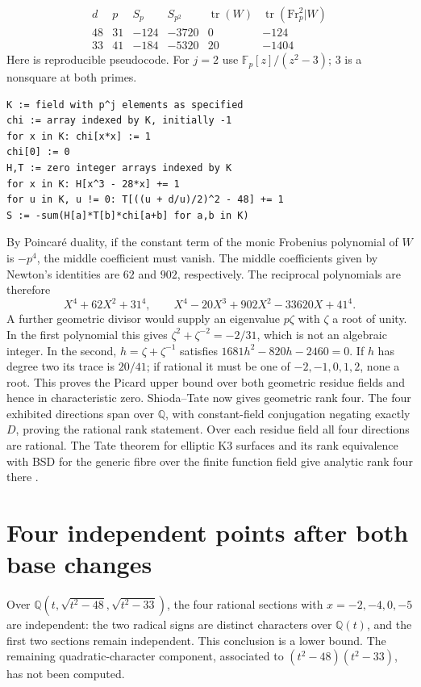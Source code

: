 \documentclass[11pt]{article}
\newcommand{\Q}{\mathbb Q}
\newcommand{\F}{\mathbb F}
\begin{document}
\[
\begin{array}{r|r|r|r|r|r}
d&p&S_p&S_{p^2}&\operatorname{tr}(W)&\operatorname{tr}(\mathrm{Fr}_p^2|W)\\\hline
48&31&-124&-3720&0&-124\\
33&41&-184&-5320&20&-1404
\end{array}
\]
Here is reproducible pseudocode. For $j=2$ use
$\F_p[z]/(z^2-3)$; $3$ is a nonsquare at both primes.
\begin{verbatim}
K := field with p^j elements as specified
chi := array indexed by K, initially -1
for x in K: chi[x*x] := 1
chi[0] := 0
H,T := zero integer arrays indexed by K
for x in K: H[x^3 - 28*x] += 1
for u in K, u != 0: T[((u + d/u)/2)^2 - 48] += 1
S := -sum(H[a]*T[b]*chi[a+b] for a,b in K)
\end{verbatim}

By Poincar\'e duality, if the constant term of the monic Frobenius
polynomial of $W$ is $-p^4$, the middle coefficient must vanish.
The middle coefficients given by Newton's identities are $62$ and
$902$, respectively. The reciprocal polynomials are therefore
\[
 X^4+62X^2+31^4,\qquad
 X^4-20X^3+902X^2-33620X+41^4 .
\]
A further geometric divisor would supply an eigenvalue $p\zeta$
with $\zeta$ a root of unity. In the first polynomial this gives
$\zeta^2+\zeta^{-2}=-2/31$, which is not an algebraic integer.
In the second, $h=\zeta+\zeta^{-1}$ satisfies
$1681h^2-820h-2460=0$. If $h$ has degree two its trace is $20/41$;
if rational it must be one of $-2,-1,0,1,2$, none a root.
This proves the Picard upper bound over both geometric residue fields
and hence in characteristic zero. Shioda--Tate now gives geometric
rank four. The four exhibited directions span over $\Q$, with
constant-field conjugation negating exactly $D$, proving the rational
rank statement. Over each residue field all four directions are
rational. The Tate theorem for elliptic K3 surfaces and its
rank equivalence with BSD for the generic fibre over the finite
function field give analytic rank four there \cite{ASD,Ulmer}.

\section{Four independent points after both base changes}
Over $\Q(t,\sqrt{t^2-48},\sqrt{t^2-33})$, the four rational
sections with $x=-2,-4,0,-5$ are independent: the two radical signs
are distinct characters over $\Q(t)$, and the first two sections
remain independent. This conclusion is a lower bound. The remaining
quadratic-character component, associated to $(t^2-48)(t^2-33)$,
has not been computed.
\end{document}
